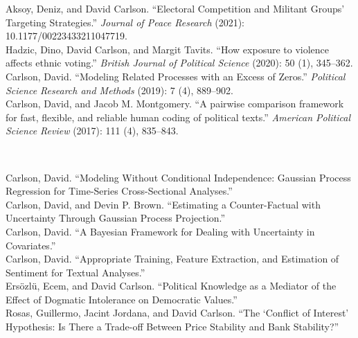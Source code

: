 \documentclass[12pt]{article}
\begin{document}
\FlushLeft
Aksoy, Deniz, and David Carlson. ``Electoral Competition and Militant Groups' Targeting Strategies.'' \emph{Journal of Peace Research} (2021): 10.1177/00223433211047719.\\

\FlushLeft
Hadzic, Dino, David Carlson, and Margit Tavits. ``How exposure to violence affects ethnic voting.'' \emph{British Journal of Political Science} (2020): 50 (1), 345--362.\\

\FlushLeft
Carlson, David. ``Modeling Related Processes with an Excess of Zeros.'' \emph{Political Science Research and Methods} (2019): 7 (4), 889--902.\\


\FlushLeft
Carlson, David, and Jacob M. Montgomery. ``A pairwise comparison framework for fast, flexible, and reliable human coding of political texts.'' \emph{American Political Science Review} (2017): 111 (4), 835--843.\\

\vspace{.75cm}

\\
\vspace{.2cm}

\FlushLeft
Carlson, David. ``Modeling Without Conditional Independence: Gaussian Process Regression for Time-Series Cross-Sectional Analyses.''\\

\FlushLeft
Carlson, David, and Devin P. Brown. ``Estimating a Counter-Factual with Uncertainty Through Gaussian Process Projection.''\\

\FlushLeft
Carlson, David. ``A Bayesian Framework for Dealing with Uncertainty in Covariates.''\\

\FlushLeft
Carlson, David. ``Appropriate Training, Feature Extraction, and Estimation of Sentiment for Textual Analyses.''\\

\FlushLeft
Ers\"{o}zl\"{u}, Ecem, and David Carlson. ``Political Knowledge as a Mediator of the Effect of Dogmatic Intolerance on Democratic Values.''\\

\FlushLeft Rosas, Guillermo, Jacint Jordana, and David Carlson. ``The `Conflict of Interest' Hypothesis: Is There a Trade-off Between Price Stability and Bank Stability?''\\
\end{document}
